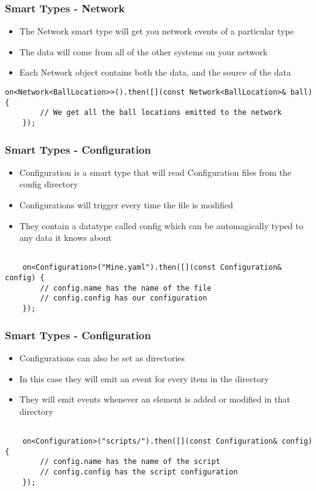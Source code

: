 \documentclass{beamer}
\begin{document}
\begin{frame}[fragile]
	\frametitle{Smart Types - Network}
	\begin{itemize}
		\item The Network smart type will get you network events of a particular type
		\item The data will come from all of the other systems on your network
		\item Each Network object contains both the data, and the source of the data
	\end{itemize}

	\begin{lstlisting}[language=nuclear]
	on<Network<BallLocation>>().then([](const Network<BallLocation>& ball) {
	    // We get all the ball locations emitted to the network
	});
	\end{lstlisting}
\end{frame}

\begin{frame}[fragile]
	\frametitle{Smart Types - Configuration}
	\begin{itemize}
		\item Configuration is a smart type that will read Configuration files from the config directory
		\item Configurations will trigger every time the file is modified
		\item They contain a datatype called config which can be automagically typed to any data it knows about
	\end{itemize}

	\begin{lstlisting}[language=nuclear]

	on<Configuration>("Mine.yaml").then([](const Configuration& config) {
	    // config.name has the name of the file
	    // config.config has our configuration
	});
	\end{lstlisting}
\end{frame}

\begin{frame}[fragile]
	\frametitle{Smart Types - Configuration}

	\begin{itemize}
		\item Configurations can also be set as directories
		\item In this case they will emit an event for every item in the directory
		\item They will emit events whenever an element is added or modified in that directory
	\end{itemize}

	\begin{lstlisting}[language=nuclear]

	on<Configuration>("scripts/").then([](const Configuration& config) {
	    // config.name has the name of the script
	    // config.config has the script configuration
	});
	\end{lstlisting}
\end{frame}
\end{document}
